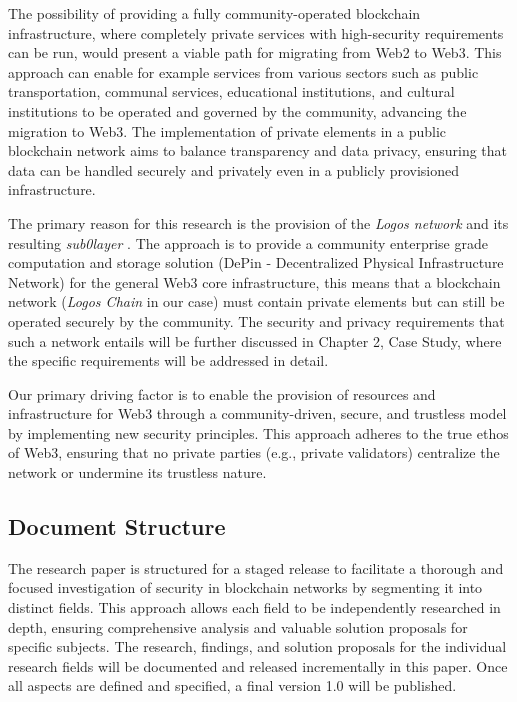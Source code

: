 The possibility of providing a fully community-operated blockchain infrastructure, where completely private services with high-security requirements can be run, would present a viable path for migrating from Web2 to Web3. This approach can enable for example services from various sectors such as public transportation, communal services, educational institutions, and cultural institutions to be operated and governed by the community, advancing the migration to Web3. The implementation of private elements in a public blockchain network aims to balance transparency and data privacy, ensuring that data can be handled securely and privately even in a publicly provisioned infrastructure.

The primary reason for this research is the provision of the \textit{Logos network} \cite{AboutLogosNetworkDocs} and its resulting \textit{sub0layer} \cite{sub0layerBlog}. The approach is to provide a community enterprise grade computation and storage solution (DePin - Decentralized Physical Infrastructure Network) for the general Web3 core infrastructure, this means that a blockchain network (\textit{Logos Chain} in our case) must contain private elements but can still be operated securely by the community. The security and privacy requirements that such a network entails will be further discussed in Chapter 2, Case Study, where the specific requirements will be addressed in detail.

Our primary driving factor is to enable the provision of resources and infrastructure for Web3 through a community-driven, secure, and trustless model by implementing new security principles. This approach adheres to the true ethos of Web3, ensuring that no private parties (e.g., private validators) centralize the network or undermine its trustless nature.   

\subsection{Document Structure}
The research paper is structured for a staged release to facilitate a thorough and focused investigation of security in blockchain networks by segmenting it into distinct fields. This approach allows each field to be independently researched in depth, ensuring comprehensive analysis and valuable solution proposals for specific subjects. The research, findings, and solution proposals for the individual research fields will be documented and released incrementally in this paper. Once all aspects are defined and specified, a final version 1.0 will be published.

